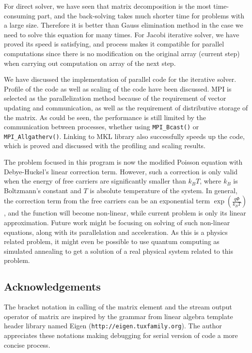 \documentclass{article}
\begin{document}
\begin{spacing}{1.1}
For direct solver, we have seen that matrix decomposition is the most time-consuming part, and the back-solving takes much shorter time for problems with a large size. Therefore it is better than Gauss elimination method in the case we need to solve this equation for many times. For Jacobi iterative solver, we have proved its speed is satisfying, and process makes it compatible for parallel computations since there is no modification on the original array (current step) when carrying out computation on array of the next step.

We have discussed the implementation of parallel code for the iterative solver. Profile of the code as well as scaling of the code have been discussed. MPI is selected as the parallelization method because of the requirement of vector updating and communication, as well as the requirement of distributive storage of the matrix. As could be seen, the performance is still limited by the communication between processes, whether using \texttt{MPI\_Bcast()} or \texttt{MPI\_Allgatherv()}. Linking to MKL library also successfully speeds up the code, which is proved and discussed with the profiling and scaling results.

The problem focused in this program is now the modified Poisson equation with Debye-Huckel's linear correction term. However, such a correction is only valid when the energy of free carriers are significantly smaller than $k_B T$, where $k_B$ is Boltzmann's constant and $T$ is absolute temperature of the system. In general, the correction term from the free carriers can be an exponential term $\exp(\frac{q\Phi}{k_B T})$, and the function will become non-linear, while current problem is only its linear approximation. Future work might be focusing on solving of such non-linear equations, along with its parallelation and acceleration. As this is a physics related problem, it might even be possible to use quantum computing as simulated annealing to get a solution of a real physical system related to this problem.

\newpage
\begin{appendices}

\section{Acknowledgements}

The bracket notation in calling of the matrix element and the stream output operator of matrix are inspired by the grammar from linear algebra template header library named Eigen (\texttt{http://eigen.tuxfamily.org}). The author appreciates these notations making debugging for serial version of code a more concise process.


\end{appendices}
\end{spacing}
\end{document}
